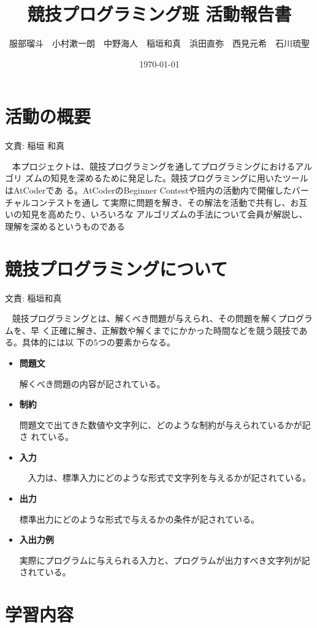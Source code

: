 \documentclass[11pt,a4paper]{jsarticle}
\title{競技プログラミング班 活動報告書}
\author{服部瑠斗　小村漱一朗　中野海人　稲垣和真　浜田直弥　西見元希　石川琉聖}
\date{\today}
\newcommand{\writtenBy}[1]{\begin{flushright}文責: #1\end{flushright}~}
\begin{document}
\maketitle
%
%
\section{活動の概要}
\writtenBy{稲垣 和真}
本プロジェクトは、競技プログラミングを通してプログラミングにおけるアルゴリ
ズムの知見を深めるために発足した。競技プログラミングに用いたツールはAtCoderであ
る。AtCoderのBeginner Contestや班内の活動内で開催したバーチャルコンテストを通し
て実際に問題を解き、その解法を活動で共有し、お互いの知見を高めたり、いろいろな
アルゴリズムの手法について会員が解説し、理解を深めるというものである

\section{競技プログラミングについて}
\writtenBy{稲垣和真}
競技プログラミングとは、解くべき問題が与えられ、その問題を解くプログラムを、早
く正確に解き、正解数や解くまでにかかった時間などを競う競技である。具体的には以
下の5つの要素からなる。
\begin{itemize}
    \item {\bf 問題文}
        \par
        解くべき問題の内容が記されている。
        \par
    \item {\bf 制約}
        \par
        問題文で出てきた数値や文字列に、どのような制約が与えられているかが記さ
        れている。
    \par
    \item {\bf 入力}
        \par
        　入力は、標準入力にどのような形式で文字列を与えるかが記されている。
    \par
    \item {\bf 出力}
        \par
        標準出力にどのような形式で与えるかの条件が記されている。
    \par
    \item {\bf 入出力例}
        \par
        実際にプログラムに与えられる入力と、プログラムが出力すべき文字列が記されている。
\end{itemize}
\section{学習内容}
\end{document}
